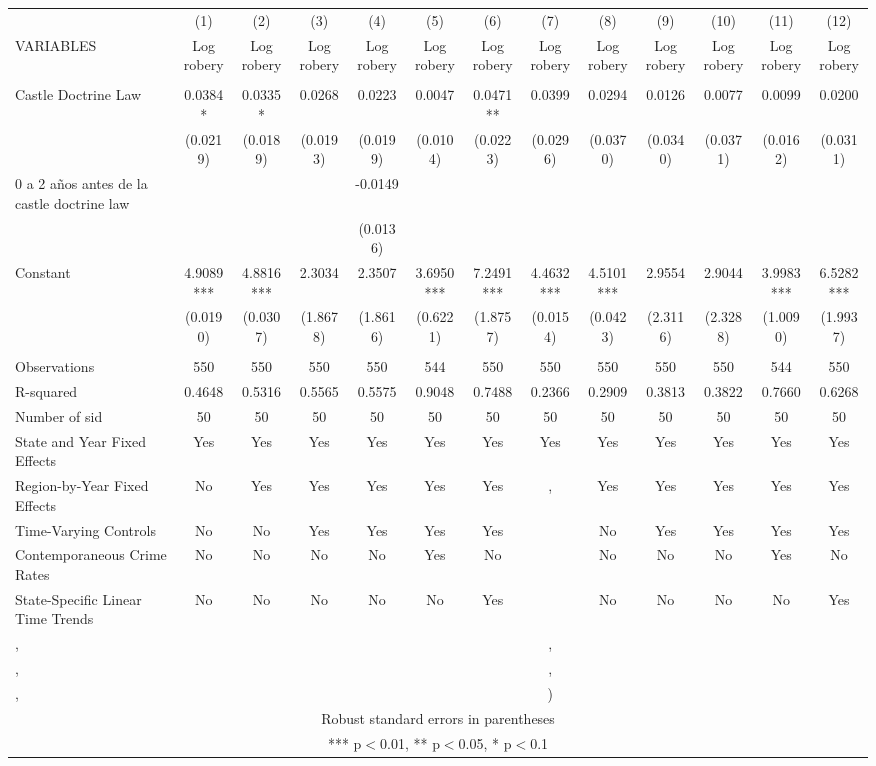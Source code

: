 \documentclass[]{article}
\begin{document}
\begin{tabular}{lcccccccccccc} \hline
 & (1) & (2) & (3) & (4) & (5) & (6) & (7) & (8) & (9) & (10) & (11) & (12) \\
VARIABLES & Log robery & Log robery & Log robery & Log robery & Log robery & Log robery & Log robery & Log robery & Log robery & Log robery & Log robery & Log robery \\ \hline
 &  &  &  &  &  &  &  &  &  &  &  &  \\
Castle Doctrine Law & 0.0384* & 0.0335* & 0.0268 & 0.0223 & 0.0047 & 0.0471** & 0.0399 & 0.0294 & 0.0126 & 0.0077 & 0.0099 & 0.0200 \\
 & (0.0219) & (0.0189) & (0.0193) & (0.0199) & (0.0104) & (0.0223) & (0.0296) & (0.0370) & (0.0340) & (0.0371) & (0.0162) & (0.0311) \\
0 a 2 años antes de la castle doctrine law &  &  &  & -0.0149 &  &  &  &  &  &  &  &  \\
 &  &  &  & (0.0136) &  &  &  &  &  &  &  &  \\
Constant & 4.9089*** & 4.8816*** & 2.3034 & 2.3507 & 3.6950*** & 7.2491*** & 4.4632*** & 4.5101*** & 2.9554 & 2.9044 & 3.9983*** & 6.5282*** \\
 & (0.0190) & (0.0307) & (1.8678) & (1.8616) & (0.6221) & (1.8757) & (0.0154) & (0.0423) & (2.3116) & (2.3288) & (1.0090) & (1.9937) \\
 &  &  &  &  &  &  &  &  &  &  &  &  \\
Observations & 550 & 550 & 550 & 550 & 544 & 550 & 550 & 550 & 550 & 550 & 544 & 550 \\
R-squared & 0.4648 & 0.5316 & 0.5565 & 0.5575 & 0.9048 & 0.7488 & 0.2366 & 0.2909 & 0.3813 & 0.3822 & 0.7660 & 0.6268 \\
Number of sid & 50 & 50 & 50 & 50 & 50 & 50 & 50 & 50 & 50 & 50 & 50 & 50 \\
State and Year Fixed Effects & Yes & Yes & Yes & Yes & Yes & Yes & Yes & Yes & Yes & Yes & Yes & Yes \\
Region-by-Year Fixed Effects & No & Yes & Yes & Yes & Yes & Yes & , & Yes & Yes & Yes & Yes & Yes \\
Time-Varying Controls & No & No & Yes & Yes & Yes & Yes &  & No & Yes & Yes & Yes & Yes \\
Contemporaneous Crime Rates & No & No & No & No & Yes & No &  & No & No & No & Yes & No \\
State-Specific Linear Time Trends & No & No & No & No & No & Yes &  & No & No & No & No & Yes \\
, &  &  &  &  &  &  & , &  &  &  &  &  \\
, &  &  &  &  &  &  & , &  &  &  &  &  \\
 , &  &  &  &  &  &  & ) &  &  &  &  &  \\ \hline
\multicolumn{13}{c}{ Robust standard errors in parentheses} \\
\multicolumn{13}{c}{ *** p$<$0.01, ** p$<$0.05, * p$<$0.1} \\
\end{tabular}
\end{document}
